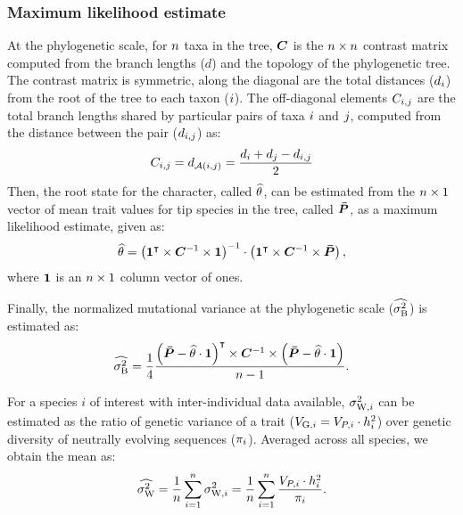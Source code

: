 \documentclass{article}
\begin{document}
\subsubsection{Maximum likelihood estimate}
At the phylogenetic scale, for $n$ taxa in the tree, $\bm{C}$ is the $n \times n$ contrast matrix computed from the branch lengths ($d$) and the topology of the phylogenetic tree.
The contrast matrix is symmetric, along the diagonal are the total distances ($d_{i}$) from the root of the tree to each taxon ($i$).
The off-diagonal elements $C_{i,j}$ are the total branch lengths shared by particular pairs of taxa $i$ and $j$, computed from the distance between the pair ($d_{i,j}$) as:
\begin{gather}
    C_{i,j} = d_{\mathcal{A}(i, j)} = \frac{d_{i} + d_{j} - d_{i,j}}{2}
\end{gather}
Then, the root state for the character, called $\widehat{\theta}$, can be estimated from the $n \times 1$ vector of mean trait values for tip species in the tree, called $\bm{\bar{P}}$, as a maximum likelihood estimate\cite{omeara_testing_2006}, given as:
\begin{gather}
    \widehat{\theta} = \left( \bm{1}^{\intercal} \times \bm{C}^{-1} \times \bm{1} \right)^{-1} \cdot \left( \bm{1}^{\intercal} \times \bm{C}^{-1} \times \bm{\bar{P}} \right), \label{eq:estimated-root-trait}
\end{gather}
where $\bm{1}$ is an $n \times 1$ column vector of ones.

Finally, the normalized mutational variance at the phylogenetic scale ($\widehat{\sigma^2_{\mathrm{B}}}$) is estimated\cite{omeara_testing_2006} as:
\begin{gather}
    \widehat{\sigma^2_{\mathrm{B}}} = \frac{1}{4}\frac{\left( \bm{\bar{P}} -  \widehat{\theta} \cdot \bm{1} \right)^{\intercal} \times \bm{C}^{-1} \times \left( \bm{\bar{P}} -  \widehat{\theta} \cdot \bm{1}  \right)}{n - 1}. \label{eq:estimated-rate-phy}
\end{gather}

For a species $i$ of interest with inter-individual data available, $\sigma^2_{\mathrm{W}, i}$ can be estimated as the ratio of genetic variance of a trait ($V_{\mathrm{G}, i} = V_{P, i} \cdot h^2_{i}$) over genetic diversity of neutrally evolving sequences ($\pi_{i}$).
Averaged across all species, we obtain the mean as:
\begin{gather}
    \widehat{\sigma^2_{\mathrm{W}}} = \dfrac{1}{n}\sum_{i=1}^{n}\sigma^2_{\mathrm{W}, i} = \dfrac{1}{n}\sum_{i=1}^{n} \frac{  V_{P, i} \cdot h^2_{i}}{ \pi_{i}}. \label{eq:estimated-rate-pop}
\end{gather}
\end{document}
